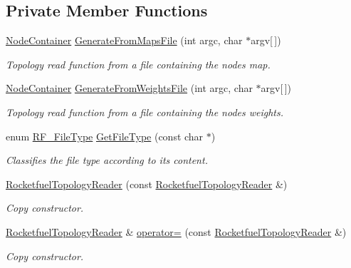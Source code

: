 \subsection*{Private Member Functions}
\begin{DoxyCompactItemize}
\item 
\hyperlink{classns3_1_1NodeContainer}{Node\+Container} \hyperlink{classns3_1_1RocketfuelTopologyReader_a96d37656f4461d609b23787180427fe0}{Generate\+From\+Maps\+File} (int argc, char $\ast$argv\mbox{[}$\,$\mbox{]})
\begin{DoxyCompactList}\small\item\em Topology read function from a file containing the nodes map. \end{DoxyCompactList}\item 
\hyperlink{classns3_1_1NodeContainer}{Node\+Container} \hyperlink{classns3_1_1RocketfuelTopologyReader_a44bf6bb1a27f15e05207af0af78a5588}{Generate\+From\+Weights\+File} (int argc, char $\ast$argv\mbox{[}$\,$\mbox{]})
\begin{DoxyCompactList}\small\item\em Topology read function from a file containing the nodes weights. \end{DoxyCompactList}\item 
enum \hyperlink{classns3_1_1RocketfuelTopologyReader_a04346285f097be349a70c57315a42415}{R\+F\+\_\+\+File\+Type} \hyperlink{classns3_1_1RocketfuelTopologyReader_aa78bf28375ac7abe01358f1ad4026a6d}{Get\+File\+Type} (const char $\ast$)
\begin{DoxyCompactList}\small\item\em Classifies the file type according to its content. \end{DoxyCompactList}\item 
\hyperlink{classns3_1_1RocketfuelTopologyReader_a4cf31ecf017288ca2843c0c3ee859b17}{Rocketfuel\+Topology\+Reader} (const \hyperlink{classns3_1_1RocketfuelTopologyReader}{Rocketfuel\+Topology\+Reader} \&)
\begin{DoxyCompactList}\small\item\em Copy constructor. \end{DoxyCompactList}\item 
\hyperlink{classns3_1_1RocketfuelTopologyReader}{Rocketfuel\+Topology\+Reader} \& \hyperlink{classns3_1_1RocketfuelTopologyReader_a1c312168371c5fb86f78898a925cab22}{operator=} (const \hyperlink{classns3_1_1RocketfuelTopologyReader}{Rocketfuel\+Topology\+Reader} \&)
\begin{DoxyCompactList}\small\item\em Copy constructor. \end{DoxyCompactList}\end{DoxyCompactItemize}
